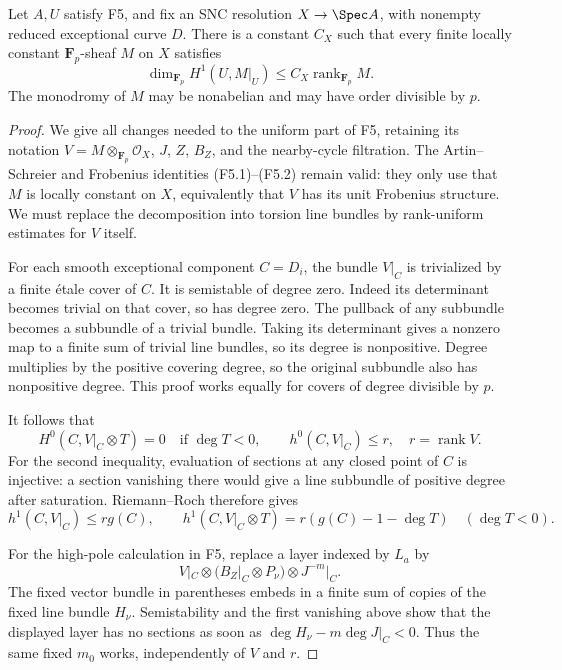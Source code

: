 \begin{proposition}
Let $A,U$ satisfy F5, and fix an SNC resolution $X\to\Spec A$,
with nonempty reduced exceptional curve $D$. There is a constant
$C_X$ such that every finite locally constant $\mathbf F_p$-sheaf
$M$ on $X$ satisfies
\[
 \dim_{\mathbf F_p}H^1(U,M|_U)
       \leq C_X\operatorname{rank}_{\mathbf F_p}M.
\]
The monodromy of $M$ may be nonabelian and may have order divisible
by $p$.
\end{proposition}
\begin{proof}
We give all changes needed to the uniform part of F5, retaining its
notation $V=M\otimes_{\mathbf F_p}\mathcal O_X$, $J$, $Z$, $B_Z$,
and the nearby-cycle filtration. The Artin--Schreier and Frobenius
identities (F5.1)--(F5.2) remain valid: they only use that $M$ is
locally constant on $X$, equivalently that $V$ has its unit
Frobenius structure. We must replace the decomposition into torsion
line bundles by rank-uniform estimates for $V$ itself.

For each smooth exceptional component $C=D_i$, the bundle $V|_C$
is trivialized by a finite \'etale cover of $C$. It is semistable of
degree zero. Indeed its determinant becomes trivial on that cover,
so has degree zero. The pullback of any subbundle becomes a
subbundle of a trivial bundle. Taking its determinant gives a
nonzero map to a finite sum of trivial line bundles, so its degree
is nonpositive. Degree multiplies by the positive covering degree,
so the original subbundle also has nonpositive degree. This proof
works equally for covers of degree divisible by $p$.

It follows that
\[
 H^0(C,V|_C\otimes T)=0\quad\text{if }\deg T<0,
 \qquad h^0(C,V|_C)\leq r,
 \quad r=\operatorname{rank}V.
\]
For the second inequality, evaluation of sections at any closed
point of $C$ is injective: a section vanishing there would give a
line subbundle of positive degree after saturation. Riemann--Roch
therefore gives
\[
 h^1(C,V|_C)\leq r g(C),\qquad
 h^1(C,V|_C\otimes T)=r(g(C)-1-\deg T)\quad(\deg T<0).
 \tag{F7.1}
\]

For the high-pole calculation in F5, replace a layer indexed by
$L_a$ by
\[
 V|_C\otimes(B_Z|_C\otimes P_\nu)\otimes J^{-m}|_C.
\]
The fixed vector bundle in parentheses embeds in a finite sum of
copies of the fixed line bundle $H_\nu$. Semistability and the first
vanishing above show that the displayed layer has no sections as
soon as $\deg H_\nu-m\deg J|_C<0$. Thus the same fixed $m_0$
works, independently of $V$ and $r$.


\end{proof}
